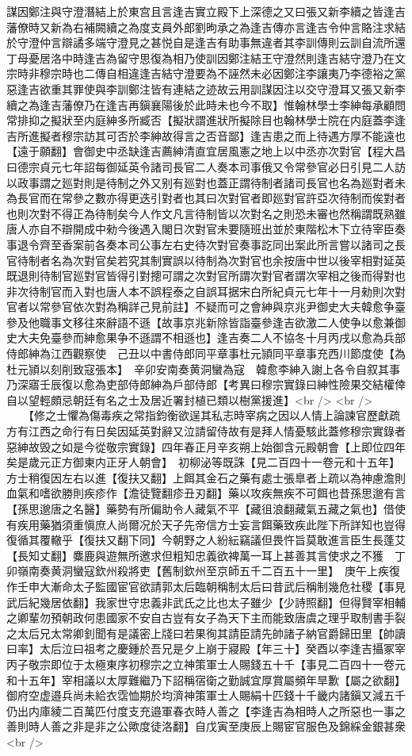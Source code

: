 謀因鄭注與守澄潛結上於東宫且言逢吉實立殿下上深德之又曰張又新李續之皆逢吉藩僚時又新為右補闕續之為度支員外郎劉昫承之為逢吉傳亦言逢吉令仲言賂注求結於守澄仲言辯譎多端守澄見之甚悦自是逢吉有助事無違者其李訓傳則云訓自流所還丁母憂居洛中時逢吉為留守思復為相乃使訓因鄭注結王守澄然則逢吉結守澄乃在文宗時非穆宗時也二傳自相違逢吉結守澄要為不誣然未必因鄭注李讓夷乃李德裕之黨惡逢吉欲重其罪使與李訓鄭注皆有連結之迹故云用訓謀因注以交守澄耳又張又新李續之為逢吉藩僚乃在逢吉再鎭襄陽後於此時未也今不取】惟翰林學士李紳每承顧問常排抑之擬狀至内庭紳多所臧否【擬狀謂進狀所擬除目也翰林學士院在内庭蓋李逢吉所進擬者穆宗訪其可否於李紳故得言之否音鄙】逢吉患之而上待遇方厚不能遠也【遠于願翻】會御史中丞缺逢吉薦紳清直宜居風憲之地上以中丞亦次對官【程大昌曰德宗貞元七年詔每御延英令諸司長官二人奏本司事俄又令常參官必日引見二人訪以政事謂之廵對則是待制之外又别有廵對也蓋正謂待制者諸司長官也名為廵對者未為長官而在常參之數亦得更迭引對者也其曰次對官者即廵對官許亞次待制而俟對者也則次對不得正為待制矣今人作文凡言待制皆以次對名之則恐未審也然稱謂既熟雖唐人亦自不辯開成中勑今後遇入閣日次對官未要隨班出並於東階松木下立待宰臣奏事退令齊至香案前各奏本司公事左右史待次對官奏事訖同出案此所言嘗以諸司之長官待制者名為次對官矣若究其制實誤以待制為次對官也余按唐中世以後宰相對延英既退則待制官廵對官皆得引對摠可謂之次對官所謂次對官者謂次宰相之後而得對也非次待制官而入對也唐人本不誤程泰之自誤耳据宋白所紀貞元七年十一月勑則次對官者以常參官依次對為稱詳己見前註】不疑而可之會紳與京兆尹御史大夫韓愈争臺參及他職事文移往來辭語不遜【故事京兆新除皆詣臺參逢吉欲激二人使争以愈兼御史大夫免臺參而紳愈果争不遜謂不相遜也】逢吉奏二人不協冬十月丙戌以愈為兵部侍郎紳為江西觀察使　己丑以中書侍郎同平章事杜元頴同平章事充西川節度使【為杜元頴以刻削致寇張本】　辛卯安南奏黄洞蠻為寇　韓愈李紳入謝上各令自叙其事乃深寤壬辰復以愈為吏部侍郎紳為戶部侍郎【考異曰穆宗實錄曰紳性險果交結權倖自以望輕頗忌朝廷有名之士及居近署封植已類以樹黨援進】<br />
<br />
　　【修之士懼為傷毒疾之常指鈞衡欲逞其私志時宰病之因以人情上論諫官歷獻疏方有江西之命行有日矣因延英對辭又泣請留侍故有是拜人情憂駭此蓋修穆宗實錄者惡紳故毁之如是今從敬宗實錄】四年春正月辛亥朔上始御含元殿朝會【上即位四年矣是歲元正方御東内正牙人朝會】　初柳泌等既誅【見二百四十一卷元和十五年】方士稍復因左右以進【復扶又翻】上餌其金石之藥有處士張臯者上疏以為神慮澹則血氣和嗜欲勝則疾疹作【澹徒覽翻疹丑刃翻】藥以攻疾無疾不可餌也昔孫思邈有言【孫思邈唐之名醫】藥勢有所偏助令人藏氣不平【藏徂浪翻藏氣五藏之氣也】借使有疾用藥猶須重愼庶人尚爾况於天子先帝信方士妄言餌藥致疾此陛下所詳知也豈得復循其覆轍乎【復扶又翻下同】今朝野之人紛紜竊議但畏忤旨莫敢進言臣生長蓬艾【長知丈翻】麋鹿與遊無所邀求但粗知忠義欲裨萬一耳上甚善其言使求之不獲　丁卯嶺南奏黄洞蠻寇欽州殺將吏【舊制欽州至京師五千二百五十一里】　庚午上疾復作壬申大漸命太子監國宦官欲請郭太后臨朝稱制太后曰昔武后稱制幾危社稷【事見武后紀幾居依翻】我家世守忠義非武氏之比也太子雖少【少詩照翻】但得賢宰相輔之卿輩勿預朝政何患國家不安自古豈有女子為天下主而能致唐虞之理乎取制書手裂之太后兄太常卿釗聞有是議密上牋曰若果徇其請臣請先帥諸子納官爵歸田里【帥讀曰率】太后泣曰祖考之慶鍾於吾兄是夕上崩于寢殿【年三十】癸酉以李逢吉攝冢宰丙子敬宗即位于太極東序初穆宗之立神策軍士人賜錢五十千【事見二百四十一卷元和十五年】宰相議以太厚難繼乃下詔稱宿衛之勤誠宜厚賞屬頻年旱歉【屬之欲翻】御府空虚邉兵尚未給衣霑恤期於均濟神策軍士人賜絹十匹錢十千畿内諸鎭又減五千仍出内庫綾二百萬匹付度支充邉軍春衣時人善之【李逢吉為相時人之所惡也一事之善則時人善之非是非之公歟度徒洛翻】自戊寅至庚辰上賜宦官服色及錦綵金銀甚衆<br />
